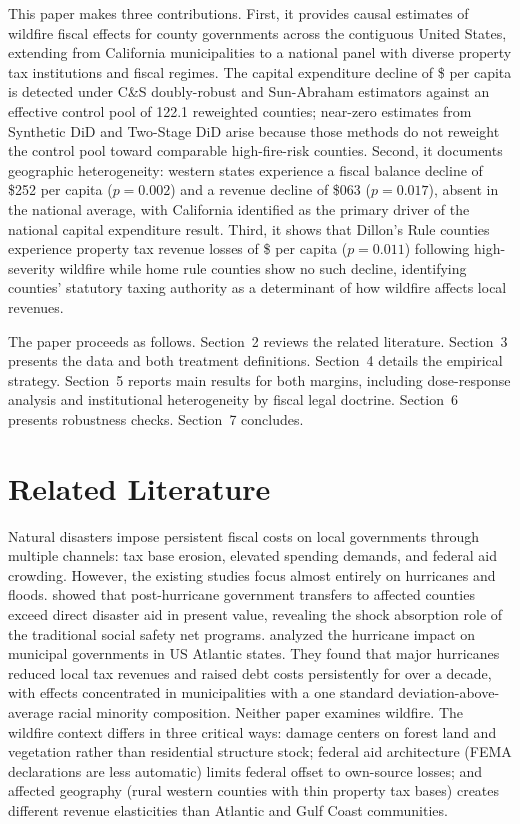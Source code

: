 \documentclass[12pt]{article}
\begin{document}
This paper makes three contributions. First, it provides causal estimates of wildfire
fiscal effects for county governments across the contiguous United States, extending
\citet{liao2022} from California municipalities to a national panel with diverse
property tax institutions and fiscal regimes. The capital expenditure decline of
\$ per capita is detected under C\&S doubly-robust and Sun-Abraham estimators
against an effective control pool of 122.1 reweighted counties; near-zero estimates
from Synthetic DiD and Two-Stage DiD arise because those methods do not reweight the
control pool toward comparable high-fire-risk counties. Second, it documents
geographic heterogeneity: western states experience a fiscal balance decline of
\$252 per capita ($p = 0.002$) and a revenue decline of \$063
($p = 0.017$), absent in the national average, with California identified as the
primary driver of the national capital expenditure result. Third, it shows that
Dillon's Rule counties experience property tax revenue losses of \$ per capita
($p = 0.011$) following high-severity wildfire while home rule counties show no
such decline, identifying counties' statutory taxing authority as a determinant of
how wildfire affects local revenues.

The paper proceeds as follows. Section~2 reviews the related literature.
Section~3 presents the data and both treatment definitions. Section~4 details
the empirical strategy. Section~5 reports main results for both margins,
including dose-response analysis and institutional heterogeneity by fiscal
legal doctrine. Section~6 presents robustness checks. Section~7 concludes.

\section{Related Literature}

Natural disasters impose persistent fiscal costs on local governments through multiple channels: tax base
erosion, elevated spending demands, and federal aid crowding. However, the existing studies focus almost 
entirely on hurricanes and floods. \citet{deryugina2017} showed that
post-hurricane government transfers to affected counties exceed direct disaster aid
in present value, revealing the shock absorption role of the traditional social safety net programs.
\citet{jerch2023} analyzed the hurricane impact on municipal governments in US Atlantic states. They found that major
hurricanes reduced local tax revenues and raised debt costs persistently for over a
decade, with effects concentrated in municipalities with a one standard deviation-above-average racial minority composition. Neither paper
examines wildfire. The wildfire context differs in three critical ways: damage centers
on forest land and vegetation rather than residential structure stock; federal aid
architecture (FEMA declarations are less automatic) limits federal offset to
own-source losses; and affected geography (rural western counties with thin property
tax bases) creates different revenue elasticities than Atlantic and Gulf Coast
communities.
\end{document}
